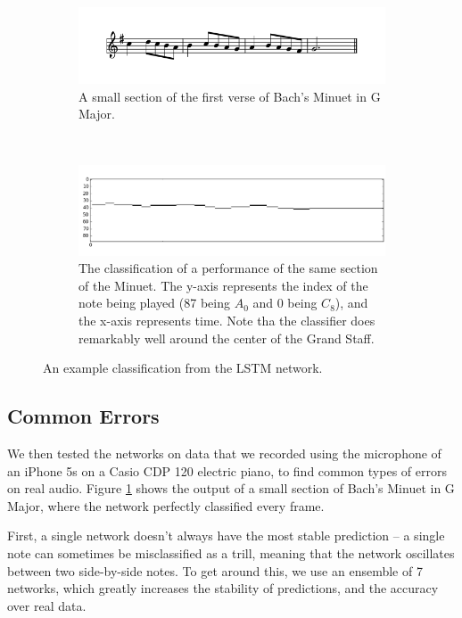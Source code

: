 \documentclass[twocolumn]{article}
\begin{document}
\begin{figure}[!tbp]
  \centering
  \begin{subfigure}[t]{0.45\textwidth}
    \centering
    \includegraphics[width=\textwidth]{figures/minuet_score.png}
    \caption{A small section of the first verse of Bach's Minuet in G Major.}
  \end{subfigure}
  ~
  \begin{subfigure}[t]{0.45\textwidth}
    \centering
    \includegraphics[width=\textwidth]{figures/minuet_rnn.png}
    \caption{The classification of a performance of the same section of the Minuet. The y-axis represents the index of the note being played (87 being $A_0$ and 0 being $C_8$), and the x-axis represents time. Note tha the classifier does remarkably well around the center of the Grand Staff.}
  \end{subfigure}
  \caption{An example classification from the LSTM network.}
  \label{fig:classification}
\end{figure}

\subsection{Common Errors}

We then tested the networks on data that we recorded using the microphone of an iPhone 5s on a Casio CDP 120 electric piano, to find common types of errors on real audio. Figure \ref{fig:classification} shows the output of a small section of Bach’s Minuet in G Major, where the network perfectly classified every frame.

First, a single network doesn’t always have the most stable prediction -- a single note can sometimes be misclassified as a trill, meaning that the network oscillates between two side-by-side notes. To get around this, we use an ensemble of 7 networks, which greatly increases the stability of predictions, and the accuracy over real data.
\end{document}
